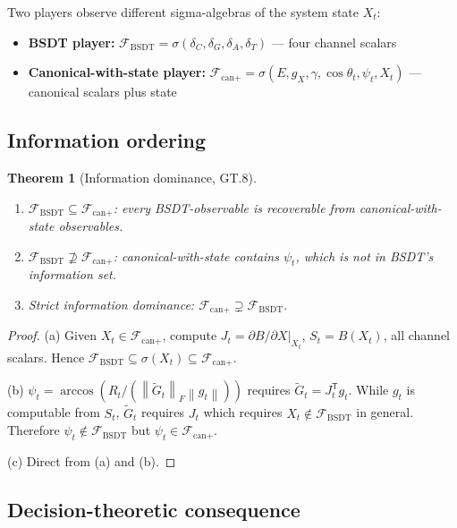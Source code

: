 \documentclass[11pt,a4paper]{article}
\newtheorem{theorem}{Theorem}[section]
\theoremstyle{definition}
\newcommand{\T}{^{\mathsf{T}}}
\newcommand{\norm}[1]{\left\|#1\right\|}
\newcommand{\gX}{g_X}
\newcommand{\bsdt}{\mathrm{BSDT}}
\begin{document}
Two players observe different sigma-algebras of the system state $X_t$:

\begin{itemize}
\item \textbf{BSDT player:} $\mathcal{F}_\bsdt = \sigma(\delta_C, \delta_G, \delta_A, \delta_T)$ --- four channel scalars
\item \textbf{Canonical-with-state player:} $\mathcal{F}_\text{can+} = \sigma(E, \gX, \gamma, \cos\theta_t, \psi_t, X_t)$ --- canonical scalars plus state
\end{itemize}

\subsection{Information ordering}

\begin{theorem}[Information dominance, GT.8]
\begin{enumerate}[label=(\alph*)]
\item $\mathcal{F}_\bsdt \subseteq \mathcal{F}_\text{can+}$: every BSDT-observable is recoverable from canonical-with-state observables.
\item $\mathcal{F}_\bsdt \not\supseteq \mathcal{F}_\text{can+}$: canonical-with-state contains $\psi_t$, which is not in BSDT's information set.
\item Strict information dominance: $\mathcal{F}_\text{can+} \supsetneq \mathcal{F}_\bsdt$.
\end{enumerate}
\end{theorem}

\begin{proof}
(a) Given $X_t \in \mathcal{F}_\text{can+}$, compute $J_t = \partial B/\partial X|_{X_t}$, $S_t = B(X_t)$, all channel scalars.
Hence $\mathcal{F}_\bsdt \subseteq \sigma(X_t) \subseteq \mathcal{F}_\text{can+}$.

(b) $\psi_t = \arccos(R_t/(\norm{\tilde G_t}_F\norm{g_t}))$ requires $\tilde G_t = J_t\T g_t$.
While $g_t$ is computable from $S_t$, $\tilde G_t$ requires $J_t$ which requires $X_t \notin \mathcal{F}_\bsdt$ in general.
Therefore $\psi_t \notin \mathcal{F}_\bsdt$ but $\psi_t \in \mathcal{F}_\text{can+}$.

(c) Direct from (a) and (b).
\end{proof}

\subsection{Decision-theoretic consequence}
\end{document}
